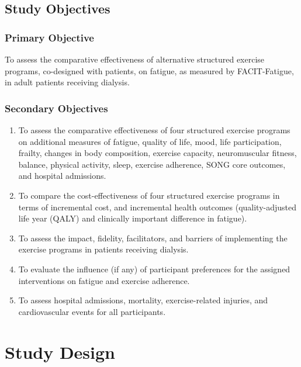 \documentclass[11pt,parskip=half-]{scrartcl}
\begin{document}
\clearpage

\subsection{Study Objectives}
\label{objectives}


\subsubsection{Primary Objective}
\label{primary-objective}

To assess the comparative effectiveness of alternative structured exercise programs, co-designed with patients, on fatigue, as measured by FACIT-Fatigue, in adult patients receiving dialysis.

\subsubsection{Secondary Objectives}
\label{secondary-objectives}

\begin{enumerate}
  \def\labelenumi{\arabic{enumi}.}
  \item To assess the comparative effectiveness of four structured exercise programs on additional measures of fatigue, quality of life, mood, life participation, frailty, changes in body composition, exercise capacity, neuromuscular fitness, balance, physical activity, sleep, exercise adherence, SONG core outcomes, and hospital admissions.
  \item To compare the cost-effectiveness of four structured exercise programs in terms of incremental cost, and incremental health outcomes (quality-adjusted life year (QALY) and clinically important difference in fatigue).
  \item To assess the impact, fidelity, facilitators, and barriers of implementing the exercise programs in patients receiving dialysis.
  \item To evaluate the influence (if any) of participant preferences for the assigned interventions on fatigue and exercise adherence.
  \item To assess hospital admissions, mortality, exercise-related injuries, and cardiovascular events for all participants.
\end{enumerate}

\clearpage

\section{Study Design}\label{study-design}
\end{document}
